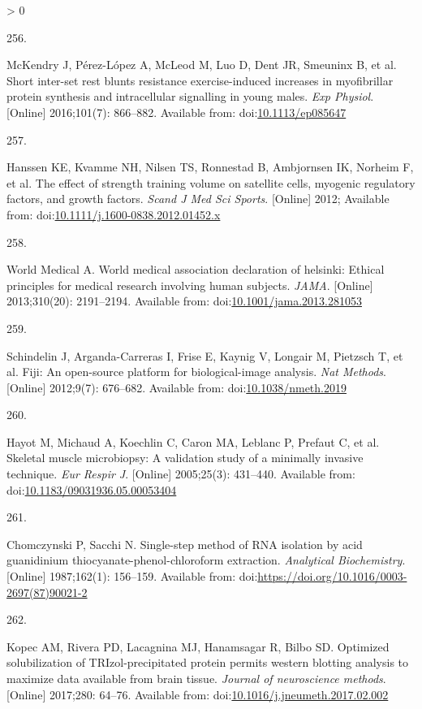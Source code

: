 \documentclass[twoside,10pt]{gihclass} %
\newlength{\cslhangindent}
\newlength{\csllabelwidth}
\newenvironment{CSLReferences}[3] %
 {%
  \setlength{\parindent}{0pt}
  \ifodd #1 \everypar{\setlength{\hangindent}{\cslhangindent}}\ignorespaces\fi
  \ifnum #2 > 0
  \setlength{\parskip}{#2\baselineskip}
  \fi
 }%
 {}
\newcommand{\CSLLeftMargin}[1]{\parbox[t]{\maxof{\widthof{#1}}{\csllabelwidth}}{#1}}
\newcommand{\CSLRightInline}[1]{\parbox[t]{\linewidth}{#1}}
\begin{document}
\begin{CSLReferences}{0}{0}
\leavevmode\hypertarget{ref-RN2857}{}%
\CSLLeftMargin{256. }
\CSLRightInline{McKendry J, Pérez-López A, McLeod M, Luo D, Dent JR, Smeuninx B, et al. Short inter-set rest blunts resistance exercise-induced increases in myofibrillar protein synthesis and intracellular signalling in young males. \emph{Exp Physiol}. {[}Online{]} 2016;101(7): 866--882. Available from: doi:\href{https://doi.org/10.1113/ep085647}{10.1113/ep085647}}

\leavevmode\hypertarget{ref-RN796}{}%
\CSLLeftMargin{257. }
\CSLRightInline{Hanssen KE, Kvamme NH, Nilsen TS, Ronnestad B, Ambjornsen IK, Norheim F, et al. The effect of strength training volume on satellite cells, myogenic regulatory factors, and growth factors. \emph{Scand J Med Sci Sports}. {[}Online{]} 2012; Available from: doi:\href{https://doi.org/10.1111/j.1600-0838.2012.01452.x}{10.1111/j.1600-0838.2012.01452.x}}

\leavevmode\hypertarget{ref-RN1590}{}%
\CSLLeftMargin{258. }
\CSLRightInline{World Medical A. World medical association declaration of helsinki: Ethical principles for medical research involving human subjects. \emph{JAMA}. {[}Online{]} 2013;310(20): 2191--2194. Available from: doi:\href{https://doi.org/10.1001/jama.2013.281053}{10.1001/jama.2013.281053}}

\leavevmode\hypertarget{ref-RN2561}{}%
\CSLLeftMargin{259. }
\CSLRightInline{Schindelin J, Arganda-Carreras I, Frise E, Kaynig V, Longair M, Pietzsch T, et al. Fiji: An open-source platform for biological-image analysis. \emph{Nat Methods}. {[}Online{]} 2012;9(7): 676--682. Available from: doi:\href{https://doi.org/10.1038/nmeth.2019}{10.1038/nmeth.2019}}

\leavevmode\hypertarget{ref-RN824}{}%
\CSLLeftMargin{260. }
\CSLRightInline{Hayot M, Michaud A, Koechlin C, Caron MA, Leblanc P, Prefaut C, et al. Skeletal muscle microbiopsy: A validation study of a minimally invasive technique. \emph{Eur Respir J}. {[}Online{]} 2005;25(3): 431--440. Available from: doi:\href{https://doi.org/10.1183/09031936.05.00053404}{10.1183/09031936.05.00053404}}

\leavevmode\hypertarget{ref-RN2672}{}%
\CSLLeftMargin{261. }
\CSLRightInline{Chomczynski P, Sacchi N. Single-step method of RNA isolation by acid guanidinium thiocyanate-phenol-chloroform extraction. \emph{Analytical Biochemistry}. {[}Online{]} 1987;162(1): 156--159. Available from: doi:\url{https://doi.org/10.1016/0003-2697(87)90021-2}}

\leavevmode\hypertarget{ref-RN2050}{}%
\CSLLeftMargin{262. }
\CSLRightInline{Kopec AM, Rivera PD, Lacagnina MJ, Hanamsagar R, Bilbo SD. Optimized solubilization of TRIzol-precipitated protein permits western blotting analysis to maximize data available from brain tissue. \emph{Journal of neuroscience methods}. {[}Online{]} 2017;280: 64--76. Available from: doi:\href{https://doi.org/10.1016/j.jneumeth.2017.02.002}{10.1016/j.jneumeth.2017.02.002}}


\end{CSLReferences}
\end{document}
